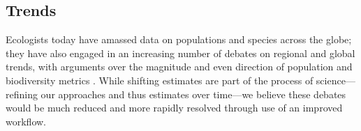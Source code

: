 \documentclass[11pt]{article}
\begin{document}
\subsection{Trends}


Ecologists today have amassed data on populations and species across the globe; they have also engaged in an increasing number of debates on regional and global trends, with arguments over the magnitude and even direction of population and biodiversity metrics \citep{Dornelas2014,Leung2020,terry2022no,muller2024weather}. While shifting estimates are part of the process of science---refining our approaches and thus estimates over time---we believe these debates would be much reduced and more rapidly resolved through use of an improved workflow. %
\end{document}
